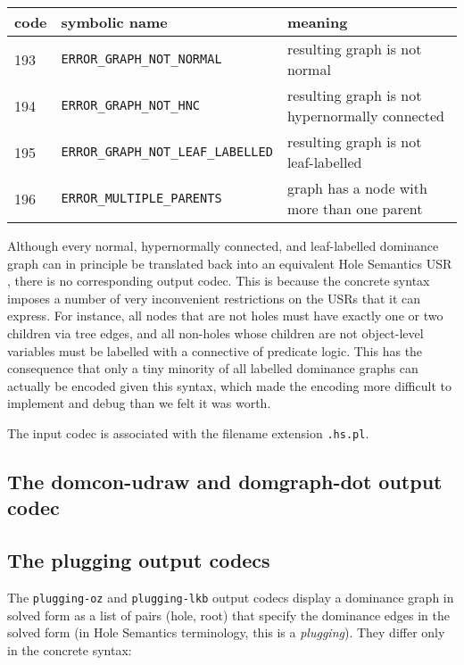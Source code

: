 \begin{tabular}{lll}
code & symbolic name & meaning \\ \hline
193 &  \verb?ERROR_GRAPH_NOT_NORMAL? & resulting graph is not normal \\
194 &  \verb?ERROR_GRAPH_NOT_HNC? & resulting graph is not hypernormally
connected \\
195 &  \verb?ERROR_GRAPH_NOT_LEAF_LABELLED? & resulting graph is not
leaf-labelled \\
196 &  \verb?ERROR_MULTIPLE_PARENTS? & graph has a node with more than one
parent 
\end{tabular}

Although every normal, hypernormally connected, and leaf-labelled
dominance graph can in principle be translated back into an equivalent
Hole Semantics USR \cite{KolNieTha03}, there is no corresponding
output codec. This is because the concrete syntax imposes a number of
very inconvenient restrictions on the USRs that it can express. For
instance, all nodes that are not holes must have exactly one or two
children via tree edges, and all non-holes whose children are not
object-level variables must be labelled with a connective of predicate
logic. This has the consequence that only a tiny minority of all
labelled dominance graphs can actually be encoded given this syntax,
which made the encoding more difficult to implement and debug than we
felt it was worth.

The input codec is associated with the filename extension \verb?.hs.pl?.




\subsection{The domcon-udraw and domgraph-dot output codec}






\subsection{The plugging output codecs}

The \verb?plugging-oz? and \verb?plugging-lkb? output codecs display a
dominance graph in solved form as a list of pairs (hole, root) that
specify the dominance edges in the solved form (in Hole Semantics
terminology, this is a \emph{plugging}). They differ only in the
concrete syntax:

